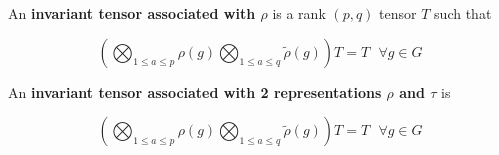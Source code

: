 \begin{defn}
    An \textbf{invariant tensor associated with $\rho$} is a rank $(p, q)$ tensor $T$ such that

    $$
        \left( \bigotimes_{1 \le a \le p} \rho(g) \bigotimes_{1 \le a \le q} \tilde \rho(g) \right) T = T
        ~~~ \forall g \in G$$
\end{defn}

\begin{defn}
    An \textbf{invariant tensor associated with 2 representations $\rho$ and $\tau$} is

    $$
        \left( \bigotimes_{1 \le a \le p} \rho(g) \bigotimes_{1 \le a \le q} \tilde \rho(g) \right) T = T
        ~~~ \forall g \in G$$
\end{defn}